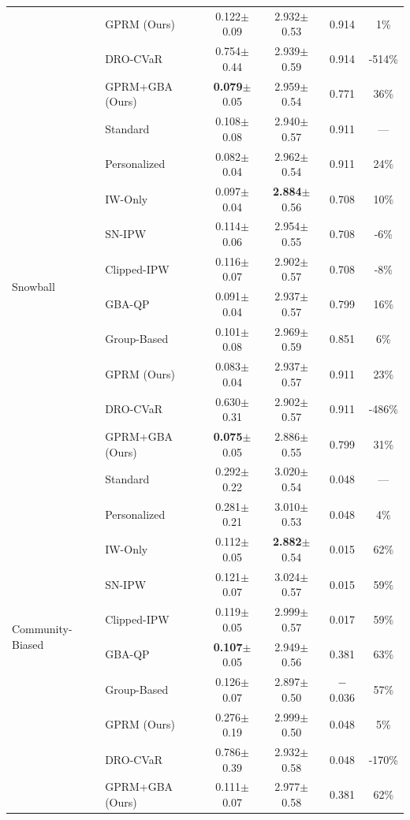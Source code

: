 \documentclass{article}
\theoremstyle{plain}
\theoremstyle{definition}
\theoremstyle{remark}
\begin{document}
\begin{table}[h]
\begin{tabular}{llcccc}
& GPRM (Ours) & 0.122{\tiny$\pm$0.09} & 2.932{\tiny$\pm$0.53} & 0.914 & 1\% \\
& DRO-CVaR & 0.754{\tiny$\pm$0.44} & 2.939{\tiny$\pm$0.59} & 0.914 & -514\% \\
& GPRM+GBA (Ours) & \textbf{0.079}{\tiny$\pm$0.05} & 2.959{\tiny$\pm$0.54} & 0.771 & 36\% \\
\midrule
\multirow{10}{*}{Snowball}
& Standard & 0.108{\tiny$\pm$0.08} & 2.940{\tiny$\pm$0.57} & 0.911 & --- \\
& Personalized & 0.082{\tiny$\pm$0.04} & 2.962{\tiny$\pm$0.54} & 0.911 & 24\% \\
& IW-Only & 0.097{\tiny$\pm$0.04} & \textbf{2.884}{\tiny$\pm$0.56} & 0.708 & 10\% \\
& SN-IPW & 0.114{\tiny$\pm$0.06} & 2.954{\tiny$\pm$0.55} & 0.708 & -6\% \\
& Clipped-IPW & 0.116{\tiny$\pm$0.07} & 2.902{\tiny$\pm$0.57} & 0.708 & -8\% \\
& GBA-QP & 0.091{\tiny$\pm$0.04} & 2.937{\tiny$\pm$0.57} & 0.799 & 16\% \\
& Group-Based & 0.101{\tiny$\pm$0.08} & 2.969{\tiny$\pm$0.59} & 0.851 & 6\% \\
& GPRM (Ours) & 0.083{\tiny$\pm$0.04} & 2.937{\tiny$\pm$0.57} & 0.911 & 23\% \\
& DRO-CVaR & 0.630{\tiny$\pm$0.31} & 2.902{\tiny$\pm$0.57} & 0.911 & -486\% \\
& GPRM+GBA (Ours) & \textbf{0.075}{\tiny$\pm$0.05} & 2.886{\tiny$\pm$0.55} & 0.799 & 31\% \\
\midrule
\multirow{10}{*}{Community-Biased}
& Standard & 0.292{\tiny$\pm$0.22} & 3.020{\tiny$\pm$0.54} & 0.048 & --- \\
& Personalized & 0.281{\tiny$\pm$0.21} & 3.010{\tiny$\pm$0.53} & 0.048 & 4\% \\
& IW-Only & 0.112{\tiny$\pm$0.05} & \textbf{2.882}{\tiny$\pm$0.54} & 0.015 & 62\% \\
& SN-IPW & 0.121{\tiny$\pm$0.07} & 3.024{\tiny$\pm$0.57} & 0.015 & 59\% \\
& Clipped-IPW & 0.119{\tiny$\pm$0.05} & 2.999{\tiny$\pm$0.57} & 0.017 & 59\% \\
& GBA-QP & \textbf{0.107}{\tiny$\pm$0.05} & 2.949{\tiny$\pm$0.56} & 0.381 & 63\% \\
& Group-Based & 0.126{\tiny$\pm$0.07} & 2.897{\tiny$\pm$0.50} & $-$0.036 & 57\% \\
& GPRM (Ours) & 0.276{\tiny$\pm$0.19} & 2.999{\tiny$\pm$0.50} & 0.048 & 5\% \\
& DRO-CVaR & 0.786{\tiny$\pm$0.39} & 2.932{\tiny$\pm$0.58} & 0.048 & -170\% \\
& GPRM+GBA (Ours) & 0.111{\tiny$\pm$0.07} & 2.977{\tiny$\pm$0.58} & 0.381 & 62\% \\
\bottomrule
\end{tabular}
\end{table}
\end{document}
